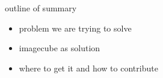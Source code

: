 outline of summary

\begin{itemize}
\item problem we are trying to solve
\item imagecube as solution
\item where to get it and how to contribute
\end{itemize}

